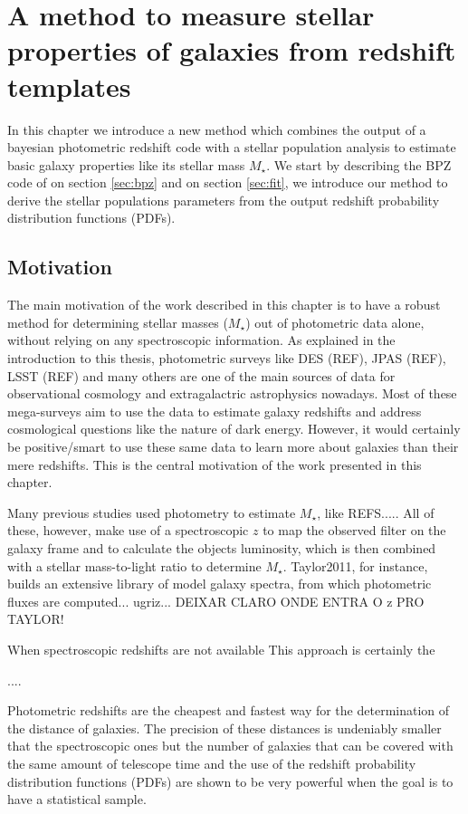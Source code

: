 \documentclass[9pt]{memoir}
\begin{document}
\chapter{A method to measure stellar properties of galaxies from redshift templates}



In this chapter we introduce a new method which combines the output of a bayesian  photometric redshift code with a stellar population analysis to estimate basic galaxy properties like its stellar mass $M_\star$.
We start by describing the BPZ code of \cite{Benitez.2000a} on section \ref{sec:bpz} and on section \ref{sec:fit}, we introduce our method to derive the stellar populations parameters from the output redshift probability distribution functions (PDFs).


\section{Motivation}
\label{sec:motivation}

The main motivation of the work described in this chapter is to have a robust method for determining stellar masses ($M_\star$) out of photometric data alone, without relying on any spectroscopic information. As explained in the introduction to this thesis, photometric surveys like DES (REF), JPAS (REF), LSST (REF) and many others are one of the main sources of data for observational cosmology and extragalactric astrophysics nowadays. Most of these mega-surveys aim to use the data to estimate galaxy redshifts and address cosmological questions like the nature of dark energy. However, it would certainly be positive/smart to use these same data to learn more about galaxies than their mere redshifts. This is the central motivation of the work presented in this chapter.


Many previous studies used photometry to estimate $M_\star$, like REFS.....
All of these, however, make use of a spectroscopic $z$ to map the observed filter on the galaxy frame and to calculate the objects luminosity, which is then combined with a stellar mass-to-light ratio to determine $M_\star$. Taylor2011, for instance, builds an extensive library of model galaxy spectra, from which photometric fluxes are computed... ugriz... DEIXAR CLARO ONDE ENTRA O z PRO TAYLOR!


When spectroscopic redshifts are not available
This approach is certainly the 

....


Photometric redshifts are the cheapest and fastest way for the determination of the distance of galaxies. The precision of these distances is undeniably smaller that the spectroscopic ones but the number of galaxies that can be covered with the same amount of telescope time and the use of the redshift probability distribution functions (PDFs) are shown to be very powerful when the goal is to have a statistical sample.
\end{document}
